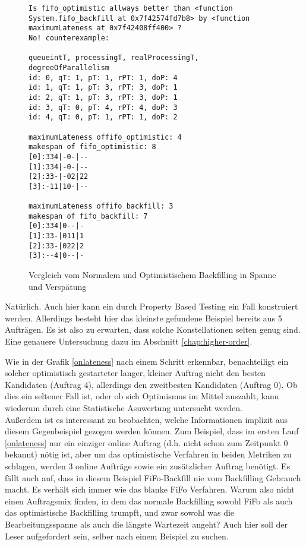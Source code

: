 \begin{figure}
\centering
\begin{verbatim}
Is fifo_optimistic allways better than <function System.fifo_backfill at 0x7f42574fd7b8> by <function maximumLateness at 0x7f42408ff400> ?
No! counterexample:

queueintT, processingT, realProcessingT, degreeOfParallelism
id: 0, qT: 1, pT: 1, rPT: 1, doP: 4
id: 1, qT: 1, pT: 3, rPT: 3, doP: 1
id: 2, qT: 1, pT: 3, rPT: 3, doP: 1
id: 3, qT: 0, pT: 4, rPT: 4, doP: 3
id: 4, qT: 0, pT: 1, rPT: 1, doP: 2

maximumLateness offifo_optimistic: 4
makespan of fifo_optimistic: 8
[0]:334|-0-|--
[1]:334|-0-|--
[2]:33-|-02|22
[3]:-11|10-|--

maximumLateness offifo_backfill: 3
makespan of fifo_backfill: 7
[0]:334|0--|-
[1]:33-|011|1
[2]:33-|022|2
[3]:--4|0--|-
\end{verbatim}
\caption{Vergleich vom Normalem und Optimistischem Backfilling in Spanne und Verspätung}
\label{onlatenessmakespan}
\end{figure}

Natürlich. Auch hier kann ein durch Property Based Testing ein Fall konstruiert werden. Allerdings besteht hier das kleinste gefundene Beispiel bereits aus 5 Aufträgen. Es ist also zu erwarten, dass solche Konstellationen selten genug sind. Eine genauere Untersuchung dazu im Abschnitt \ref{chap:higher-order}.
\FloatBarrier

Wie in der Grafik \ref{onlateness} nach einem Schritt erkennbar, benachteiligt ein solcher optimistisch gestarteter langer, kleiner Auftrag nicht den besten Kandidaten (Auftrag 4), allerdings den zweitbesten Kandidaten (Auftrag 0). Ob dies ein seltener Fall ist, oder ob sich Optimismus im Mittel auszahlt, kann wiederum durch eine Statistische Asuwertung untersucht werden.\\

Außerdem ist es interessant zu beobachten, welche Informationen implizit aus diesem Gegenbeispiel gezogen werden können. Zum Beispiel, dass im ersten Lauf \ref{onlateness} nur ein einziger online Auftrag (d.h. nicht schon zum Zeitpunkt 0 bekannt) nötig ist, aber um das optimistische Verfahren in beiden Metriken zu schlagen, werden 3 online Aufträge sowie ein zusätzlicher Auftrag benötigt. Es fällt auch auf, dass in diesem Beispiel FiFo-Backfill nie vom Backfilling Gebrauch macht. Es verhält sich immer wie das blanke FiFo Verfahren. Warum also nicht einen Auftragsmix finden, in dem das normale Backfilling sowohl FiFo als auch das optimistische Backfilling trumpft, und zwar sowohl was die Bearbeitungsspanne als auch die längste Wartezeit angeht? Auch hier soll der Leser aufgefordert sein, selber nach einem Beispiel zu suchen.\\

